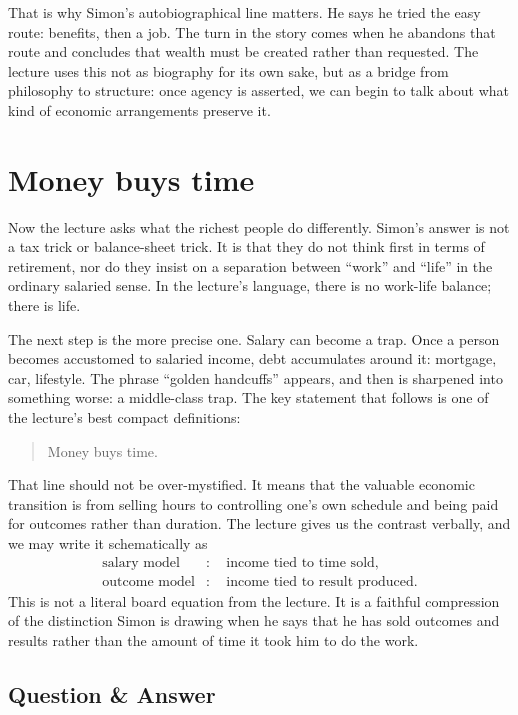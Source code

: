 That is why Simon's autobiographical line matters. He says he tried the easy route: benefits, then a job. The turn in the story comes when he abandons that route and concludes that wealth must be created rather than requested. The lecture uses this not as biography for its own sake, but as a bridge from philosophy to structure: once agency is asserted, we can begin to talk about what kind of economic arrangements preserve it.

\section{Money buys time}

Now the lecture asks what the richest people do differently. Simon's answer is not a tax trick or balance-sheet trick. It is that they do not think first in terms of retirement, nor do they insist on a separation between ``work'' and ``life'' in the ordinary salaried sense. In the lecture's language, there is no work-life balance; there is life.

The next step is the more precise one. Salary can become a trap. Once a person becomes accustomed to salaried income, debt accumulates around it: mortgage, car, lifestyle. The phrase ``golden handcuffs'' appears, and then is sharpened into something worse: a middle-class trap. The key statement that follows is one of the lecture's best compact definitions:

\begin{quote}
Money buys time.
\end{quote}

That line should not be over-mystified. It means that the valuable economic transition is from selling hours to controlling one's own schedule and being paid for outcomes rather than duration. The lecture gives us the contrast verbally, and we may write it schematically as
\begin{align}
\text{salary model} &:\quad \text{income tied to time sold},\\
\text{outcome model} &:\quad \text{income tied to result produced}.
\end{align}
This is not a literal board equation from the lecture. It is a faithful compression of the distinction Simon is drawing when he says that he has sold outcomes and results rather than the amount of time it took him to do the work.

\subsection{Question \& Answer}

